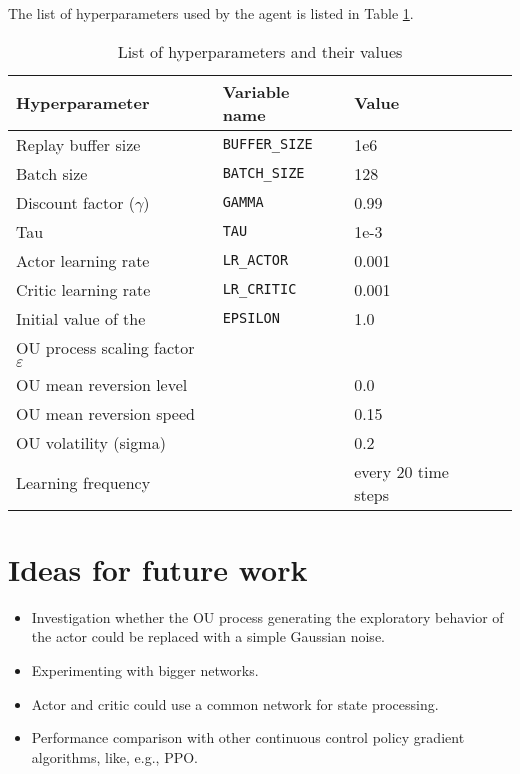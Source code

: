 \documentclass[a4paper,12pt]{amsart}
\begin{document}


The list of hyperparameters used by the agent is listed in Table \ref{tab:hyperparameters}.

\begin{table}
\caption{List of hyperparameters and their values}
\begin{tabular}{|l|l|l|l|}
    \hline
Hyperparameter & Variable name & Value \\ 
    \hline \hline
    Replay buffer size & \texttt{BUFFER\_SIZE} &  1e6 \\ \hline
    Batch size & \texttt{BATCH\_SIZE} &  128  \\  \hline
    Discount factor ($\gamma$) & \texttt{GAMMA} &  0.99 \\ \hline
    Tau & \texttt{TAU} & 1e-3 \\ \hline
    Actor learning rate & \texttt{LR\_ACTOR} & 0.001 \\ \hline
    Critic learning rate & \texttt{LR\_CRITIC} & 0.001 \\ \hline
    Initial value of the & \texttt{EPSILON} & 1.0 \\
    OU process scaling factor $\varepsilon$ && \\ \hline
    OU mean reversion level & & 0.0 \\ \hline
    OU mean reversion speed & & 0.15 \\ \hline
    OU volatility (sigma) & & 0.2 \\ \hline
    Learning frequency & \texttt{} &  every 20 time steps \\ \hline
\end{tabular}
\label{tab:hyperparameters}
\end{table}


\section{Ideas for future work}



\begin{itemize}
    \item Investigation whether the OU process generating the exploratory
        behavior of the actor could be replaced with a simple Gaussian noise.
    \item Experimenting with bigger networks.
    \item Actor and critic could use a common network for state processing. 
    \item Performance comparison with other continuous control policy gradient algorithms,
        like, e.g., PPO.
\end{itemize}


\nocite{lillicrap2015continuous}
\printbibliography
\end{document}
